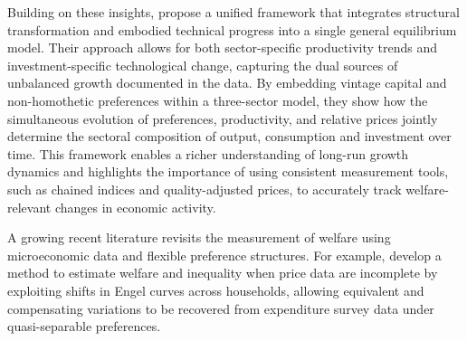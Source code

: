 \documentclass[12pt,a4paper]{article}
\newcommand{\red}[1]{\textcolor{red}{#1}} %
\begin{document}
Building on these insights, \citet{herrendorf_rogerson_valentinyi_2021} propose a unified framework that integrates structural transformation and embodied technical progress into a single general equilibrium model. Their approach allows for both sector-specific productivity trends and investment-specific technological change, capturing the dual sources of unbalanced growth documented in the data. By embedding vintage capital and non-homothetic preferences within a three-sector model, they show how the simultaneous evolution of preferences, productivity, and relative prices jointly determine the sectoral composition of output, consumption and investment over time. This framework enables a richer understanding of long-run growth dynamics and highlights the importance of using consistent measurement tools, such as chained indices and quality-adjusted prices, to accurately track welfare-relevant changes in economic activity.


A growing recent literature revisits the measurement of welfare using microeconomic data and flexible preference structures. For example, \citet{Atkin_Faber_Fally_GonzalezNavarro_2024} develop a method to estimate welfare and inequality when price data are incomplete by exploiting shifts in Engel curves across households, allowing equivalent and compensating variations to be recovered from expenditure survey data under quasi-separable preferences.
\end{document}
